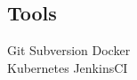 \documentclass[letterpaper]{deedy-resume} %
\begin{document}
\begin{minipage}[t]{0.33\textwidth}
\subsection{Tools}
Git \textbullet{} Subversion \textbullet{} Docker \\
\textbullet{} Kubernetes \textbullet{} JenkinsCI  \\

\sectionspace %


\end{minipage} %
\hfill
%
%
\end{document}

